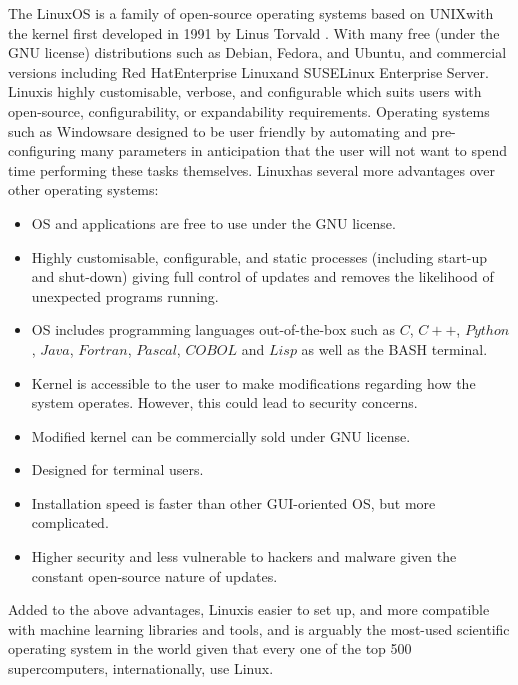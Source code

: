 \documentclass[fleqn,twoside,12pt]{report}
\begin{document}
The Linux\textregistered OS is a family of open-source operating systems based on UNIX\textregistered with the kernel first developed in 1991 by Linus Torvald \cite{wiki_linux}. With many free (under the GNU license) distributions such as Debian\textregistered, Fedora\textregistered, and Ubuntu\textregistered, and commercial versions including Red Hat\textregistered Enterprise Linux\textregistered and SUSE\textregistered Linux Enterprise Server\textregistered. Linux\textregistered is highly customisable, verbose, and configurable which suits users with open-source, configurability, or expandability requirements. Operating systems such as Windows\textregistered are designed to be user friendly by automating and pre-configuring many parameters in anticipation that the user will not want to spend time performing these tasks themselves. Linux\textregistered has several more advantages over other operating systems:

\begin{itemize}
	\item OS and applications are free to use under the GNU license.
	\item Highly customisable, configurable, and static processes (including start-up and shut-down) giving full control of updates and removes the likelihood of unexpected programs running.
	\item OS includes programming languages out-of-the-box such as $C$, $C++$, $Python$, $Java$, $Fortran$, $Pascal$, $COBOL$ and $Lisp$ as well as the BASH terminal.
	\item Kernel is accessible to the user to make modifications regarding how the system operates. However, this could lead to security concerns.
	\item Modified kernel can be commercially sold under GNU license.
	\item Designed for terminal users.
	\item Installation speed is faster than other GUI-oriented OS, but more complicated.
	\item Higher security and less vulnerable to hackers and malware given the constant open-source nature of updates. 
\end{itemize}

Added to the above advantages, Linux\textregistered is easier to set up, and more compatible with machine learning libraries and tools, and is arguably the most-used scientific operating system in the world given that every one of the top 500 supercomputers, internationally, use Linux\textregistered.
\end{document}
